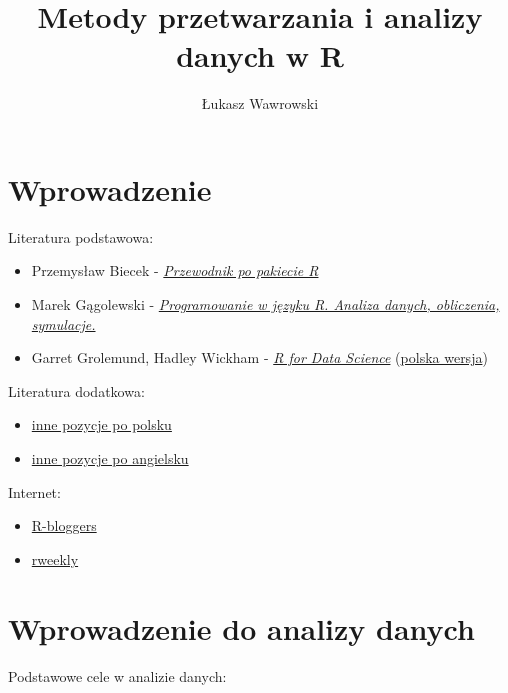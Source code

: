 \documentclass[]{book}
\title{Metody przetwarzania i analizy danych w R}
\author{Łukasz Wawrowski}
\date{}
\providecommand{\tightlist}{%
  \setlength{\itemsep}{0pt}\setlength{\parskip}{0pt}}
\begin{document}
\maketitle

{
\setcounter{tocdepth}{1}
\tableofcontents
}
\chapter*{Wprowadzenie}\label{wprowadzenie}

Literatura podstawowa:

\begin{itemize}
\tightlist
\item
  Przemysław Biecek -
  \href{http://pbiecek.github.io/Przewodnik/}{\emph{Przewodnik po
  pakiecie R}}
\item
  Marek Gągolewski -
  \href{http://www.gagolewski.com/publications/programowanier/}{\emph{Programowanie
  w języku R. Analiza danych, obliczenia, symulacje.}}
\item
  Garret Grolemund, Hadley Wickham -
  \href{http://r4ds.had.co.nz/}{\emph{R for Data Science}}
  (\href{https://helion.pl/ksiazki/jezyk-r-kompletny-zestaw-narzedzi-dla-analitykow-danych-hadley-wickham-garrett-grolemund,jezrko.htm}{polska
  wersja})
\end{itemize}

Literatura dodatkowa:

\begin{itemize}
\tightlist
\item
  \href{https://github.com/mi2-warsaw/SER/blob/master/histoRia/README.md}{inne
  pozycje po polsku}
\item
  \href{https://bookdown.org/}{inne pozycje po angielsku}
\end{itemize}

Internet:

\begin{itemize}
\tightlist
\item
  \href{https://www.r-bloggers.com/}{R-bloggers}
\item
  \href{https://rweekly.org/}{rweekly}
\end{itemize}

\chapter{Wprowadzenie do analizy
danych}\label{wprowadzenie-do-analizy-danych}

Podstawowe cele w analizie danych:
\end{document}
